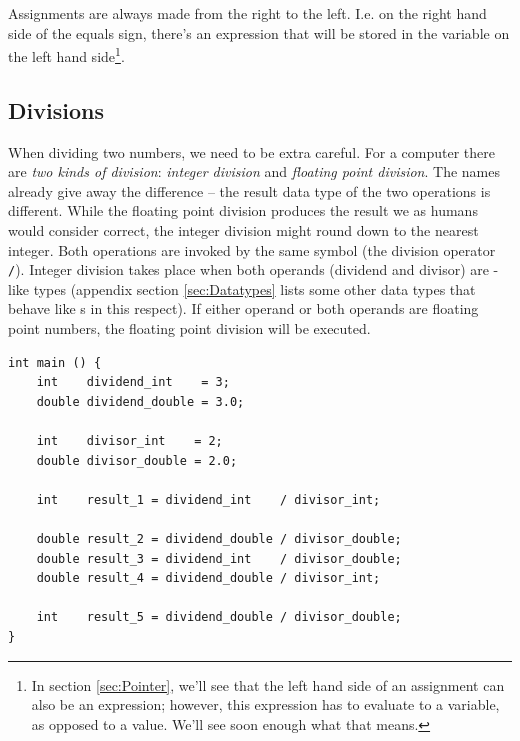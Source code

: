 Assignments are always made from the right to the left. I.\;e. on the right hand side of the equals sign, there's an expression that will be stored in the variable on the left hand side\footnote{In section \ref{sec:Pointer}, we'll see that the left hand side of an assignment can also be an expression; however, this expression has to evaluate to a variable, as opposed to a value. We'll see soon enough what that means.}.

\begin{tcbraster}[raster columns=2,
                  raster equal height,
                  nobeforeafter,
                  raster column skip=0.2cm]
\begin{codebox}
\end{codebox}
%
\begin{warnbox}
\end{warnbox}
\end{tcbraster}

\subsection{Divisions}
When dividing two numbers, we need to be extra careful. For a computer there are \emph{two kinds of division}: \emph{integer division} and \emph{floating point division}. The names already give away the difference -- the result data type of the two operations is different. While the floating point division produces the result we as humans would consider correct, the integer division might round down to the nearest integer. Both operations are invoked by the same symbol (the division operator \texttt{/}). Integer division takes place when both operands (dividend and divisor) are -like types (appendix section \ref{sec:Datatypes} lists some other data types that behave like s in this respect). If either operand or both operands are floating point numbers, the floating point division will be executed.

\begin{codebox}[divisions.c]
\begin{verbatim}
int main () {
    int    dividend_int    = 3;
    double dividend_double = 3.0;
    
    int    divisor_int    = 2;
    double divisor_double = 2.0;

    int    result_1 = dividend_int    / divisor_int;
    
    double result_2 = dividend_double / divisor_double;
    double result_3 = dividend_int    / divisor_double;
    double result_4 = dividend_double / divisor_int;

    int    result_5 = dividend_double / divisor_double;
}
\end{verbatim}
 \label{code:divisions}
\end{codebox}

